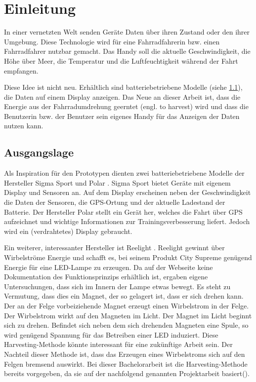 \chapter{Einleitung}

In einer vernetzten Welt senden Geräte Daten über ihren Zustand oder den ihrer Umgebung. Diese Technologie wird für eine Fahrradfahrerin bzw. einen Fahrradfahrer nutzbar gemacht. Das Handy soll die aktuelle Geschwindigkeit, die Höhe über Meer, die Temperatur und die Luftfeuchtigkeit während der Fahrt empfangen.

Diese Idee ist nicht neu. Erhältlich sind batteriebetriebene Modelle (siehe \ref{ausgang}), die Daten auf einem Display anzeigen. Das Neue an dieser Arbeit ist, dass die Energie aus der Fahrradumdrehung geerntet (engl. to harvest) wird und dass die Benutzerin bzw. der Benutzer sein eigenes Handy für das Anzeigen der Daten nutzen kann.


\section{Ausgangslage}
\label{ausgang}

Als Inspiration für den Prototypen dienten zwei batteriebetriebene Modelle der Hersteller Sigma Sport  und Polar . Sigma Sport bietet Geräte mit eigenem Display und  Sensoren an. Auf dem Display erscheinen neben der Geschwindigkeit die Daten der Sensoren, die GPS-Ortung und der aktuelle Ladestand der Batterie. Der Hersteller Polar stellt ein Gerät her, welches die Fahrt über GPS aufzeichnet und wichtige Informationen zur Trainingsverbesserung liefert. Jedoch wird ein (verdrahtetes) Display gebraucht.

Ein weiterer, interessanter Hersteller ist Reelight  . Reelight gewinnt über Wirbelströme Energie und schafft es, bei seinem Produkt City Supreme genügend Energie für eine LED-Lampe zu erzeugen. Da auf der Webseite keine Dokumentation des Funktionsprinzips erhältlich ist, ergaben eigene Untersuchungen, dass sich im Innern der Lampe \glqq etwas\grqq \medskip {} bewegt. Es steht zu Vermutung, dass dies ein Magnet, der so gelagert ist, dass er sich drehen kann. Der an der Felge vorbeiziehende Magnet erzeugt einen Wirbelstrom in der Felge. Der Wirbelstrom wirkt auf den Magneten im Licht. Der Magnet im Licht beginnt sich zu drehen. Befindet sich neben dem sich drehenden Magneten eine Spule, so wird genügend Spannung für das Betreiben einer LED induziert. Diese Harvesting-Methode könnte interessant für eine zukünftige Arbeit sein. Der Nachteil dieser Methode ist, dass das Erzeugen eines Wirbelstroms sich auf den Felgen bremsend auswirkt.  Bei dieser Bachelorarbeit ist die Harvesting-Methode bereits vorgegeben, da sie auf der nachfolgend genannten Projektarbeit basiert(\cite{PA_bicycle}).

